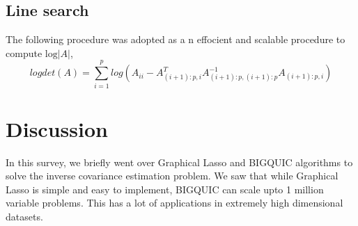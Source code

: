 \documentclass[12pt]{article}
\begin{document}
 \subsection{Line search}
The following procedure was adopted as a n effocient and scalable procedure to compute $\text{log}|A|$,\[log det(A)=\displaystyle\sum_{i=1}^{p}log(A_{ii}-A_{(i+1):p,i}^{T}A_{(i+1):p,(i+1):p}^{-1}A_{(i+1):p,i}) \]

\section{Discussion}
In this survey, we briefly went over Graphical Lasso and BIGQUIC algorithms to solve the inverse covariance estimation problem. We saw that while Graphical Lasso is simple and easy to implement, BIGQUIC can scale upto 1 million variable problems. This has a lot of applications in extremely high dimensional datasets.

{}
 
\end{document}
